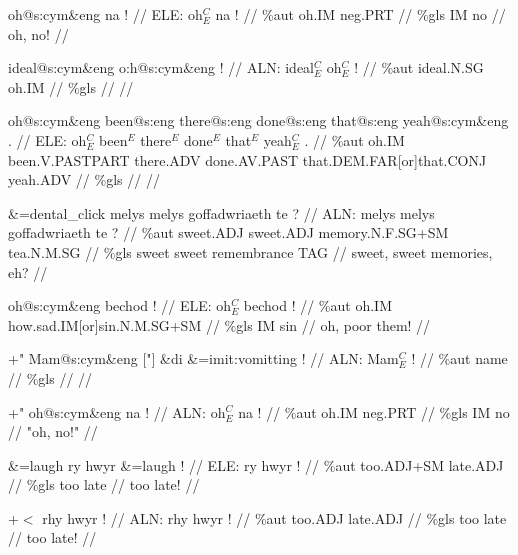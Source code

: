 \documentclass[a4paper,10pt]{article}
\begin{document}
\ex
\begingl[lingstyle=gergl]
\glchat oh@s:cym\&eng na ! //
\glsurface ELE:  oh$^{C}_{E}$ na !  //
\glauto \%aut  oh{\scriptsize .IM} neg{\scriptsize .PRT}   //
\glmanual \%gls  IM no   //
\gleng oh, no! //
\endgl
\xe

\ex
\begingl[lingstyle=gergl]
\glchat ideal@s:cym\&eng o:h@s:cym\&eng ! //
\glsurface ALN:  ideal$^{C}_{E}$ oh$^{C}_{E}$ !  //
\glauto \%aut  ideal{\scriptsize .N.SG} oh{\scriptsize .IM}   //
\glmanual \%gls      //
\gleng  //
\endgl
\xe

\ex
\begingl[lingstyle=gergl]
\glchat oh@s:cym\&eng been@s:eng there@s:eng done@s:eng that@s:eng yeah@s:cym\&eng . //
\glsurface ELE:  oh$^{C}_{E}$ been$^{E}$ there$^{E}$ done$^{E}$ that$^{E}$ yeah$^{C}_{E}$ .  //
\glauto \%aut  oh{\scriptsize .IM} been{\scriptsize .V.PASTPART} there{\scriptsize .ADV} done{\scriptsize .AV.PAST} that{\scriptsize .DEM.FAR[or]that.CONJ} yeah{\scriptsize .ADV}   //
\glmanual \%gls          //
\gleng  //
\endgl
\xe

\ex
\begingl[lingstyle=gergl]
\glchat \&=dental\_click melys melys goffadwriaeth te ? //
\glsurface ALN:  melys melys goffadwriaeth te ?  //
\glauto \%aut  sweet{\scriptsize .ADJ} sweet{\scriptsize .ADJ} memory{\scriptsize .N.F.SG+SM} tea{\scriptsize .N.M.SG}   //
\glmanual \%gls  sweet sweet remembrance TAG   //
\gleng sweet, sweet memories, eh? //
\endgl
\xe

\ex
\begingl[lingstyle=gergl]
\glchat oh@s:cym\&eng bechod ! //
\glsurface ELE:  oh$^{C}_{E}$ bechod !  //
\glauto \%aut  oh{\scriptsize .IM} how{\scriptsize .sad.IM[or]sin.N.M.SG+SM}   //
\glmanual \%gls  IM sin   //
\gleng oh, poor them! //
\endgl
\xe

\ex
\begingl[lingstyle=gergl]
\glchat +" Mam@s:cym\&eng ["] \&di \&=imit:vomitting ! //
\glsurface ALN:  Mam$^{C}_{E}$ !  //
\glauto \%aut  name   //
\glmanual \%gls     //
\gleng  //
\endgl
\xe

\ex
\begingl[lingstyle=gergl]
\glchat +" oh@s:cym\&eng na ! //
\glsurface ALN:  oh$^{C}_{E}$ na !  //
\glauto \%aut  oh{\scriptsize .IM} neg{\scriptsize .PRT}   //
\glmanual \%gls  IM no   //
\gleng "oh, no!" //
\endgl
\xe

\ex
\begingl[lingstyle=gergl]
\glchat \&=laugh ry hwyr \&=laugh ! //
\glsurface ELE:  ry hwyr !  //
\glauto \%aut  too{\scriptsize .ADJ+SM} late{\scriptsize .ADJ}   //
\glmanual \%gls  too late   //
\gleng too late! //
\endgl
\xe

\ex
\begingl[lingstyle=gergl]
\glchat +$<$ rhy hwyr ! //
\glsurface ALN:  rhy hwyr !  //
\glauto \%aut  too{\scriptsize .ADJ} late{\scriptsize .ADJ}   //
\glmanual \%gls  too late   //
\gleng too late! //
\endgl
\xe
\end{document}
